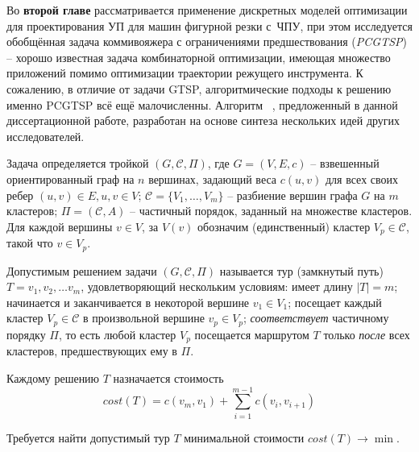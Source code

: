 
Во {\bf второй главе}
рассматривается
применение дискретных моделей оптимизации
для проектирования УП для машин
фигурной резки с~ЧПУ,
при этом исследуется
обобщённая задача коммивояжера с
ограничениями предшествования ({\it PCGTSP}) --
хорошо известная задача комбинаторной оптимизации,
имеющая множество приложений помимо
оптимизации траектории режущего инструмента.
К сожалению,
в отличие от задачи GTSP,
алгоритмические подходы к решению
именно PCGTSP всё ещё малочисленны.
Алгоритм~
\cite{bi:pcgtsp2021},
предложенный в данной диссертационной работе,
разработан
на основе синтеза нескольких идей других исследователей.

Задача определяется тройкой
$(G,\mathcal C,\Pi)$,
где
$G=(V,E,c)$ -- взвешенный ориентированный граф на $n$
вершинах,
задающий веса $c(u,v)$ для всех своих ребер
$(u,v)\in E, u, v \in V$;
$\mathcal C=\{V_1,\ldots,V_m\}$ -- разбиение вершин
графа $G$ на $m$ кластеров;
$ \Pi = (\mathcal C, A) $ -- частичный порядок,
заданный на множестве кластеров.
Для каждой вершины
$v\in V$, за $V(v)$
обозначим (единственный) кластер
$V_p\in\mathcal C$,
такой что
$v\in V_p$.

Допустимым решением задачи
$(G,\mathcal C,\Pi)$
называется тур (замкнутый путь) $T = v_1, v_2, \dots v_m$,
удовлетворяющий нескольким условиям:
  имеет длину $|T|=m$;
  начинается и заканчивается в некоторой вершине $v_1\in V_1$;
  посещает каждый кластер $V_p\in\mathcal C$ в произвольной вершине $v_p \in V_p$;
  \textit{соответствует} частичному порядку $\Pi$,
  то есть любой кластер $V_p$
  посещается маршрутом $T$
  только \textit{после}
  всех кластеров, предшествующих ему в
  $\Pi$.

Каждому решению
$T$
назначается стоимость
\begin{equation}
    \label{eq:pctgsp-cost}
	cost(T) = c(v_m,v_1) + \sum_{i=1}^{m-1} c(v_i,v_{i+1})
\end{equation}

Требуется найти
допустимый тур
$ T $
минимальной стоимости
$
cost (T) \to \min
$.

